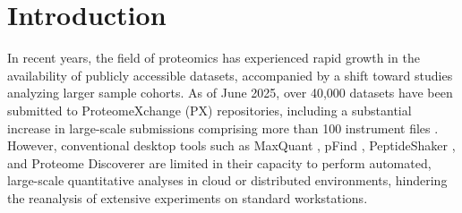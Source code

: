 \documentclass[12pt]{article}
\begin{document}
\section{Introduction}
In recent years, the field of proteomics has experienced rapid growth in the availability of publicly accessible datasets, accompanied by a shift toward studies analyzing larger sample cohorts. As of June 2025, over 40,000 datasets have been submitted to ProteomeXchange (PX) repositories, including a substantial increase in large-scale submissions comprising more than 100 instrument files \cite{perez-riverol_pride_2025}. However, conventional desktop tools such as MaxQuant \cite{cox_maxquant_2008}, pFind \cite{wang_pfind_2007}, PeptideShaker \cite{vaudel2015peptideshaker}, and Proteome Discoverer are limited in their capacity to perform automated, large-scale quantitative analyses in cloud or distributed environments, hindering the reanalysis of extensive experiments on standard workstations. %

\end{document}
